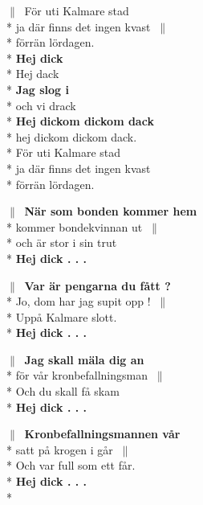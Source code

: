 \begin{SongText}[Kalmarevisan]
    \begin{SongVerse}
        $\|\:$ För uti Kalmare stad\\*%
        ja där finns det ingen kvast $\:\|$\\*%
        förrän lördagen.\\*%
        \textbf{Hej dick}\\*%
        Hej dack\\*%
        \textbf{Jag slog i}\\*%
        och vi drack\\*%
        \textbf{Hej dickom dickom dack}\\*%
        hej dickom dickom dack.\\*%
        För uti Kalmare stad\\*%
        ja där finns det ingen kvast\\*%
        förrän lördagen.
    \end{SongVerse}
    \begin{SongVerse}
        $\|\:$ \textbf{När som bonden kommer hem}\\*%
        kommer bondekvinnan ut $\:\|$\\*%
        och är stor i sin trut\\*%
        \textbf{Hej dick . . .}
    \end{SongVerse}
    \begin{SongVerse}
        $\|\:$ \textbf{Var är pengarna du fått ?}\\*%
        Jo, dom har jag supit opp ! $\:\|$\\*%
        Uppå Kalmare slott.\\*%
        \textbf{Hej dick . . .}
    \end{SongVerse}
    \begin{SongVerse}
        $\|\:$ \textbf{Jag skall mäla dig an}\\*%
        för vår kronbefallningsman $\:\|$\\*%
        Och du skall få skam\\*%
        \textbf{Hej dick . . .}
    \end{SongVerse}
    \begin{SongVerse}
        $\|\:$ \textbf{Kronbefallningsmannen vår}\\*%
        satt på krogen i går $\:\|$\\*%
        Och var full som ett får.\\*%
        \textbf{Hej dick . . .}\\*%

\end{SongVerse}
\end{SongText}

